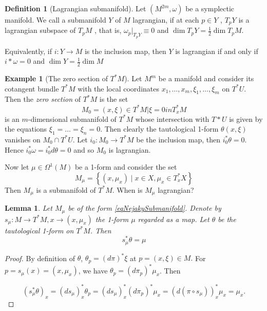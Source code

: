 \documentclass{article}
\newtheorem{lemma}[theorem]{Lemma} %
\theoremstyle{definition}
\newtheorem{definition}[theorem]{Definition}
\newtheorem{example}[theorem]{Example}
\begin{document}
\begin{definition}[Lagrangian submanifold]
    Let $(M^{2m},\omega)$ be a symplectic manifold. We call a submanifold $Y$ of $M$ lagrangian, if at each $p \in Y$ , $T_pY$ is a lagrangian
    subspace of $T_pM$ , that is, $\omega_p|_{T_pY} \equiv 0$ and $\operatorname{dim} T_pY = \frac{1}{2} \operatorname{dim} T_pM$.

    Equivalently, if $i : Y \rightarrow M$ is the inclusion map, then $Y$ is lagrangian if and only if $i*\omega = 0$ and $\operatorname{dim} Y = \frac{1}{2} \operatorname{dim} M$ 
    
\end{definition}

\begin{example}[The zero section of $T^*M$]
    Let $M^m$ be a manifold and consider its cotangent bundle $T^*M$ with the local coordinates $x_1, \ldots, x_m, \xi_1, \ldots, \xi_m$ on $T^*U$. Then the \textit{zero section} of $T^*M$ is the set 
    \begin{equation*}
        M_0 = {(x,\xi) \in T^*M | \xi = 0 in T^*_xM}
    \end{equation*}
    is an $m$-dimensional submanifold of $T^*M$ whose intersection with $T*U$ is given by the equations $\xi_1 = \ldots = \xi_n = 0$. Then clearly the tautological 1-form $\theta(x, \xi)$ vanishes on $M_0 \cap T^*U$. Let $i_0 : M_0 \rightarrow T^*M$ be the inclusion map, then $i_0^* \theta = 0$. Hence $i_0^* \omega = i_0^*d \theta = 0$ and so $M_0$ is lagrangian.
\end{example}

Now let $\mu \in \Omega^1(M)$ be a 1-form and consider the set 
\begin{equation}\label{eqNejakySubmanifold}
    M_\mu=\left\{\left(x, \mu_x\right) \mid x \in X, \mu_x \in T_x^* X\right\}
\end{equation}
Then $M_\mu$ is a submanifold of $T^*M$. When is $M_\mu$ lagrangian?

\begin{lemma}
    Let $M_\mu$ be of the form \eqref{eqNejakySubmanifold}. Denote by $s_\mu : M \rightarrow T^*M, x \rightarrow (x, \mu_x)$ the 1-form $\mu$ regarded as a map. Let $\theta$ be the tautological 1-form on $T^*M$. Then
    \begin{equation*}
        s^*_\mu \theta = \mu
    \end{equation*}
\end{lemma}
\begin{proof}
    By definition of $\theta$, $\theta_p = (d\pi)^* \xi$ at $p = (x, \xi) \in M.$
For $p = s_\mu(x) = (x, \mu_x)$, we have $\theta_p = (d\pi_p)^* \mu_x$. Then 

\begin{equation*}
    (s_\mu^* \theta)_x = (ds_\mu)^*_x \theta_p = (ds_\mu)^*_x (d\pi_p)^* \mu_x = \left( d(\pi \circ s_\mu) \right)^*_x \mu_x = \mu_x.
\end{equation*}
\end{proof}
\end{document}
